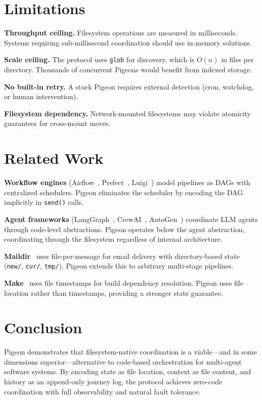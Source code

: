 \documentclass[11pt,a4paper]{article}
\begin{document}
\section{Limitations}

\textbf{Throughput ceiling.} Filesystem operations are measured in milliseconds. Systems requiring sub-millisecond coordination should use in-memory solutions.

\textbf{Scale ceiling.} The protocol uses \texttt{glob} for discovery, which is $O(n)$ in files per directory. Thousands of concurrent Pigeons would benefit from indexed storage.

\textbf{No built-in retry.} A stuck Pigeon requires external detection (cron, watchdog, or human intervention).

\textbf{Filesystem dependency.} Network-mounted filesystems may violate atomicity guarantees for cross-mount moves.

\section{Related Work}

\textbf{Workflow engines} (Airflow~\cite{airflow}, Prefect~\cite{prefect}, Luigi~\cite{luigi}) model pipelines as DAGs with centralized schedulers. Pigeon eliminates the scheduler by encoding the DAG implicitly in \texttt{send()} calls.

\textbf{Agent frameworks} (LangGraph~\cite{langgraph}, CrewAI~\cite{crewai}, AutoGen~\cite{autogen}) coordinate LLM agents through code-level abstractions. Pigeon operates below the agent abstraction, coordinating through the filesystem regardless of internal architecture.

\textbf{Maildir}~\cite{maildir} uses file-per-message for email delivery with directory-based state (\texttt{new/}, \texttt{cur/}, \texttt{tmp/}). Pigeon extends this to arbitrary multi-stage pipelines.

\textbf{Make}~\cite{make} uses file timestamps for build dependency resolution. Pigeon uses file location rather than timestamps, providing a stronger state guarantee.

\section{Conclusion}

Pigeon demonstrates that filesystem-native coordination is a viable---and in some dimensions superior---alternative to code-based orchestration for multi-agent software systems. By encoding state as file location, context as file content, and history as an append-only journey log, the protocol achieves zero-code coordination with full observability and natural fault tolerance.
\end{document}
